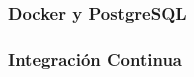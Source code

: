 
\subsubsection{Docker y PostgreSQL}
\label{subsubsec:docker-postgres}


\subsubsection{Integraci\'on Continua}
\label{subsubsec:cicd}

